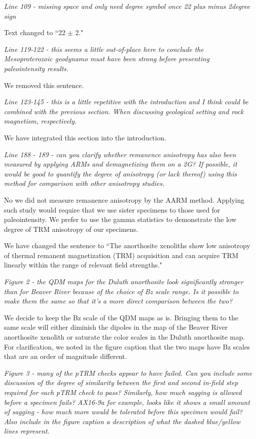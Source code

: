 \documentclass[11pt, letterpaper]{article}
\begin{document}
\begin{flushleft}
\textit{Line 109 - missing space and only need degree symbol once 22 {plus minus} 2{degree sign}}

Text changed to ``22 $\pm$ 2\textdegree."

\textit{Line 119-122 - this seems a little out-of-place here to conclude the Mesoproterozoic geodynamo must have been strong before presenting paleointensity results.}

We removed this sentence. 

\textit{Line 123-145 - this is a little repetitive with the introduction and I think could be combined with the previous section. When discussing geological setting and rock magnetism, respectively.}

We have integrated this section into the introduction. 

\textit{Line 188 - 189 - can you clarify whether remanence anisotropy has also been measured by applying ARMs and demagnetizing them on a 2G? If possible, it would be good to quantify the degree of anisotropy (or lack thereof) using this method for comparison with other anisotropy studies.}

No we did not measure remanence anisotropy by the AARM method. Applying such study would require that we use sister specimens to those used for paleointensity. We prefer to use the gamma statistics to demonstrate the low degree of TRM anisotropy of our specimens. 

We have changed the sentence to ``The anorthosite xenoliths show low anisotropy of thermal remanent magnetization (TRM) acquisition and can acquire TRM linearly within the range of relevant field strengths."

\textit{Figure 2 - the QDM maps for the Duluth anorthosite look significantly stronger than for Beaver River because of the choice of Bz scale range. Is it possible to make them the same so that it's a more direct comparison between the two?}

We decide to keep the Bz scale of the QDM maps as is. Bringing them to the same scale will either diminish the dipoles in the map of the Beaver River anorthosite xenolith or saturate the color scales in the Duluth anorthosite map. For clarification, we noted in the figure caption that the two maps have Bz scales that are an order of magnitude different.

\textit{Figure 3 - many of the pTRM checks appear to have failed. Can you include some discussion of the degree of similarity between the first and second in-field step required for each pTRM check to pass? Similarly, how much sagging is allowed before a specimen fails? AX16-9a for example, looks like it shows a small amount of sagging - how much more would be tolerated before this specimen would fail? Also include in the figure caption a description of what the dashed blue/yellow lines represent.}


\end{flushleft}
\end{document}
